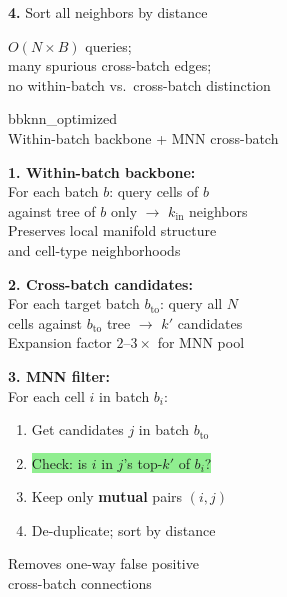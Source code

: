 \documentclass[8pt]{article}
\newlength{\colw}
\begin{document}
\begin{minipage}[t]{\colw}
\begin{stepbox}
\textbf{4.} Sort all neighbors by distance
\end{stepbox}

\vspace{4pt}
\begin{center}
{\scriptsize\color{black!50} $O(N \times B)$ queries;\\
many spurious cross-batch edges;\\
no within-batch vs.\ cross-batch distinction}
\end{center}
\end{minipage}%
\hfill
\begin{minipage}[t]{\colw}
\begin{tcolorbox}[colback=hdrB, colframe=hdrB, fontupper=\bfseries\footnotesize\color{white},
    arc=2pt, left=2pt, right=2pt, top=1pt, bottom=1pt]
\centering bbknn\_optimized\\[-2pt]
{\scriptsize\mdseries Within-batch backbone + MNN cross-batch}
\end{tcolorbox}
\vspace{1pt}

\begin{keyboxG}
\textbf{1. Within-batch backbone:}\\
For each batch $b$: query cells of $b$\\
against tree of $b$ only $\to$ $k_\text{in}$ neighbors\\
{\scriptsize\color{added} Preserves local manifold structure\\
and cell-type neighborhoods}
\end{keyboxG}\vspace{1pt}

\begin{keyboxG}
\textbf{2. Cross-batch candidates:}\\
For each target batch $b_\text{to}$: query all $N$\\
cells against $b_\text{to}$ tree $\to$ $k'$ candidates\\
{\scriptsize Expansion factor $2\text{--}3\times$ for MNN pool}
\end{keyboxG}\vspace{1pt}

\begin{keyboxG}
\textbf{3. MNN filter:}\\
For each cell $i$ in batch $b_i$:
\begin{enumerate}[leftmargin=1em, itemsep=0pt, topsep=1pt, parsep=0pt]
\item Get candidates $j$ in batch $b_\text{to}$
\item \colorbox{lightgreen}{Check: is $i$ in $j$'s top-$k'$ of $b_i$?}
\item Keep only \textbf{mutual} pairs $(i,j)$
\item De-duplicate; sort by distance
\end{enumerate}
{\scriptsize\color{added} Removes one-way false positive\\
cross-batch connections}
\end{keyboxG}\vspace{1pt}


\end{minipage}
\end{document}
